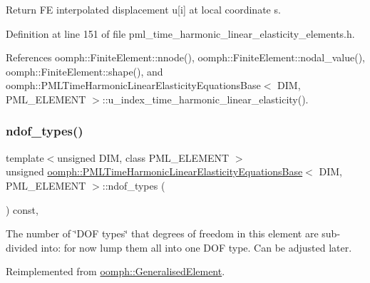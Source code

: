 Return FE interpolated displacement u\mbox{[}i\mbox{]} at local coordinate s. 



Definition at line 151 of file pml\+\_\+time\+\_\+harmonic\+\_\+linear\+\_\+elasticity\+\_\+elements.\+h.



References oomph\+::\+Finite\+Element\+::nnode(), oomph\+::\+Finite\+Element\+::nodal\+\_\+value(), oomph\+::\+Finite\+Element\+::shape(), and oomph\+::\+P\+M\+L\+Time\+Harmonic\+Linear\+Elasticity\+Equations\+Base$<$ D\+I\+M, P\+M\+L\+\_\+\+E\+L\+E\+M\+E\+N\+T $>$\+::u\+\_\+index\+\_\+time\+\_\+harmonic\+\_\+linear\+\_\+elasticity().

\mbox{\label{classoomph_1_1PMLTimeHarmonicLinearElasticityEquationsBase_a5d0b3ed720b44499cf9e174c8d46b040}} 
\subsubsection{\texorpdfstring{ndof\+\_\+types()}{ndof\_types()}}
{\footnotesize\ttfamily template$<$unsigned D\+IM, class P\+M\+L\+\_\+\+E\+L\+E\+M\+E\+NT $>$ \\
unsigned \hyperlink{classoomph_1_1PMLTimeHarmonicLinearElasticityEquationsBase}{oomph\+::\+P\+M\+L\+Time\+Harmonic\+Linear\+Elasticity\+Equations\+Base}$<$ D\+IM, P\+M\+L\+\_\+\+E\+L\+E\+M\+E\+NT $>$\+::ndof\+\_\+types (\begin{DoxyParamCaption}{ }\end{DoxyParamCaption}) const\hspace{0.3cm}{\ttfamily [inline]}, {\ttfamily [virtual]}}



The number of \char`\"{}\+D\+O\+F types\char`\"{} that degrees of freedom in this element are sub-\/divided into\+: for now lump them all into one D\+OF type. Can be adjusted later. 



Reimplemented from \hyperlink{classoomph_1_1GeneralisedElement_a0c6037a870597b35dcf1c780710b9a56}{oomph\+::\+Generalised\+Element}.




